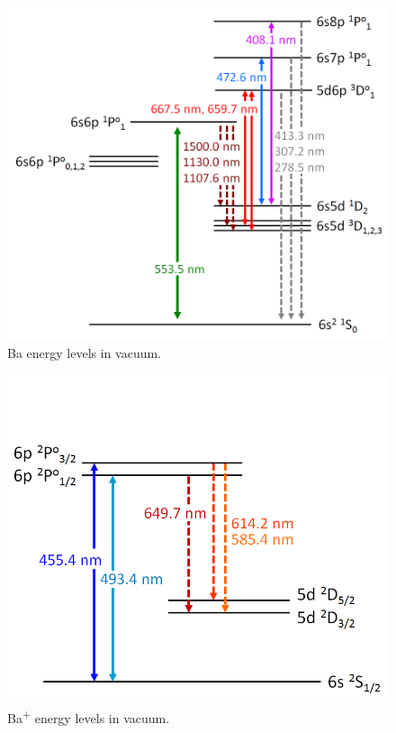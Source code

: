 
\begin{figure} %
	\includegraphics[width=.8\textwidth]{figures/elevs_Ba_extra.png}
	\caption{Ba energy levels in vacuum.}
    \label{fig:elevsBa}
\end{figure}

\begin{figure} %
	\includegraphics[width=.6\textwidth]{figures/elevs_Ba+_separate.png}
	\caption{Ba\textsuperscript{+} energy levels in vacuum.}
    \label{fig:elevsBaPlus}
\end{figure}

